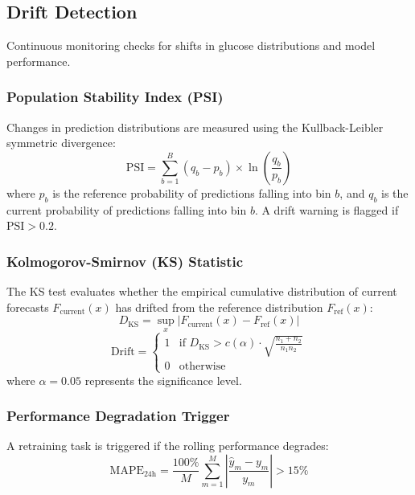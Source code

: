 \documentclass[10pt,journal,compsoc,twocolumn]{IEEEtran}
\begin{document}
\subsection{Drift Detection}
Continuous monitoring checks for shifts in glucose distributions and model performance.

\subsubsection{Population Stability Index (PSI)}
Changes in prediction distributions are measured using the Kullback-Leibler symmetric divergence:
\begin{equation}
\text{PSI} = \sum_{b=1}^B \left( q_b - p_b \right) \times \ln\left(\frac{q_b}{p_b}\right)
\end{equation}
where $p_b$ is the reference probability of predictions falling into bin $b$, and $q_b$ is the current probability of predictions falling into bin $b$. A drift warning is flagged if $\text{PSI} > 0.2$.

\subsubsection{Kolmogorov-Smirnov (KS) Statistic}
The KS test evaluates whether the empirical cumulative distribution of current forecasts $F_{\text{current}}(x)$ has drifted from the reference distribution $F_{\text{ref}}(x)$:
\begin{equation}
D_{\text{KS}} = \sup_x \left| F_{\text{current}}(x) - F_{\text{ref}}(x) \right|
\end{equation}
\begin{equation}
\text{Drift} = \begin{cases} 1 & \text{if } D_{\text{KS}} > c(\alpha) \cdot \sqrt{\frac{n_1 + n_2}{n_1 n_2}} \\ 0 & \text{otherwise} \end{cases}
\end{equation}
where $\alpha = 0.05$ represents the significance level.

\subsubsection{Performance Degradation Trigger}
A retraining task is triggered if the rolling performance degrades:
\begin{equation}
\text{MAPE}_{24\text{h}} = \frac{100\%}{M} \sum_{m=1}^M \left| \frac{\hat{y}_m - y_m}{y_m} \right| > 15\%
\end{equation}
\end{document}

